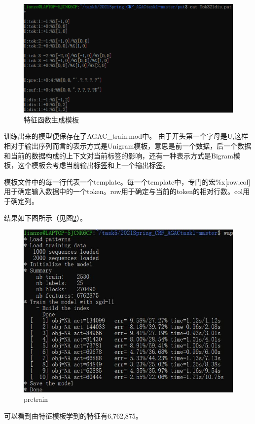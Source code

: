 \documentclass[12pt]{article}
\begin{document}
\begin{figure}[H]
  \centering
  \includegraphics[scale=0.5]{./picture/feature.png} %
  \caption{特征函数生成模板} %
  \label{fffff} %
\end{figure}
训练出来的模型便保存在了AGAC\_train.mod中。
由于开头第一个字母是U,这样相对于输出序列而言的表示方式是Unigram模板，意思是前一个数据，后一个数据和当前的数据构成的上下文对当前标签的影响，还有一种表示方式是Bigram模板，这个模板会考虑当前输出标签和上一个输出标签。\par
模板文件中的每一行代表一个template。每一个template中，专门的宏\%x[row,col]用于确定输入数据中的一个token。row用于确定与当前的token的相对行数。col用于确定列。\par
结果如下图所示（见图\ref{221aa}）。
\begin{figure}[H]
  \centering
  \includegraphics[scale=0.6]{./picture/pretrain.png} %
  \caption{pretrain} %
  \label{221aa} %
\end{figure}
可以看到由特征模板学到的特征有6,762,875。
\end{document}
